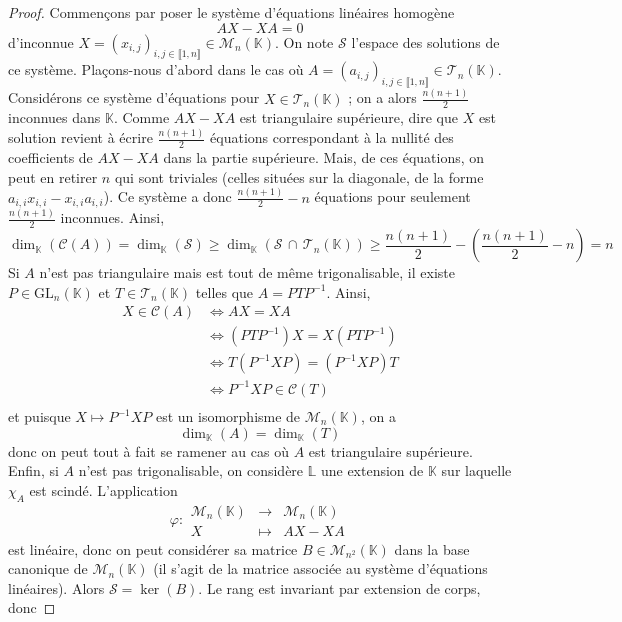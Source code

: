   \begin{proof}
    Commençons par poser le système d'équations linéaires homogène
    \[ AX - XA = 0 \]
    d'inconnue $X = (x_{i,j})_{i,j \in \llbracket 1, n \rrbracket} \in \mathcal{M}_n(\mathbb{K})$. On note $\mathcal{S}$ l'espace des solutions de ce système.
    \newpar
    Plaçons-nous d'abord dans le cas où $A = (a_{i,j})_{i,j \in \llbracket 1, n \rrbracket} \in \mathcal{T}_n(\mathbb{K})$. Considérons ce système d'équations pour $X \in \mathcal{T}_n(\mathbb{K})$ ; on a alors $\frac{n(n+1)}{2}$ inconnues dans $\mathbb{K}$. Comme $AX-XA$ est triangulaire supérieure, dire que $X$ est solution revient à écrire $\frac{n(n+1)}{2}$ équations correspondant à la nullité des coefficients de $AX - XA$ dans la partie supérieure. Mais, de ces équations, on peut en retirer $n$ qui sont triviales (celles situées sur la diagonale, de la forme $a_{i,i} x_{i,i} - x_{i,i} a_{i,i}$). Ce système a donc $\frac{n(n+1)}{2} - n$ équations pour seulement $\frac{n(n+1)}{2}$ inconnues. Ainsi,
    \[ \dim_{\mathbb{K}}(\mathcal{C}(A)) = \dim_{\mathbb{K}}(\mathcal{S}) \geq \dim_{\mathbb{K}}(\mathcal{S} \, \cap \, \mathcal{T}_n(\mathbb{K})) \geq \frac{n(n+1)}{2} - \left( \frac{n(n+1)}{2} - n \right) = n \]
    Si $A$ n'est pas triangulaire mais est tout de même trigonalisable, il existe $P \in \mathrm{GL}_n(\mathbb{K})$ et $T \in \mathcal{T}_n(\mathbb{K})$ telles que $A = PTP^{-1}$. Ainsi,
    \begin{align*}
      X \in \mathcal{C}(A) &\iff AX = XA \\
      &\iff (PTP^{-1}) X = X (PTP^{-1}) \\
      &\iff T (P^{-1}XP) = (P^{-1}XP) T \\
      &\iff P^{-1}XP \in \mathcal{C}(T) \\
    \end{align*}
    et puisque $X \mapsto P^{-1}XP$ est un isomorphisme de $\mathcal{M}_n(\mathbb{K})$, on a
    \[ \dim_{\mathbb{K}}(A) = \dim_{\mathbb{K}}(T) \]
    donc on peut tout à fait se ramener au cas où $A$ est triangulaire supérieure.
    \newpar
    Enfin, si $A$ n'est pas trigonalisable, on considère $\mathbb{L}$ une extension de $\mathbb{K}$ sur laquelle $\chi_A$ est scindé. L'application
    \[ \varphi :
    \begin{array}{ccc}
      \mathcal{M}_n(\mathbb{K}) &\rightarrow& \mathcal{M}_n(\mathbb{K}) \\
      X &\mapsto& AX-XA
    \end{array}
    \]
    est linéaire, donc on peut considérer sa matrice $B \in \mathcal{M}_{n^2}(\mathbb{K})$ dans la base canonique de $\mathcal{M}_n(\mathbb{K})$ (il s'agit de la matrice associée au système d'équations linéaires). Alors $\mathcal{S} = \ker(B)$. Le rang est invariant par extension de corps, donc

\end{proof}
